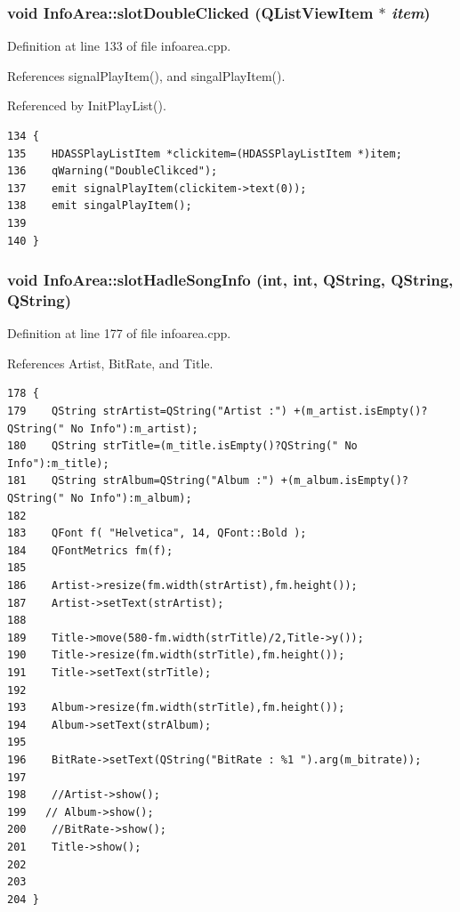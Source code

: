 \subsubsection{\setlength{\rightskip}{0pt plus 5cm}void Info\-Area::slot\-Double\-Clicked (QList\-View\-Item $\ast$ {\em item})\hspace{0.3cm}{\tt  [slot]}}\label{classInfoArea_InfoAreai3}




Definition at line 133 of file infoarea.cpp.

References signal\-Play\-Item(), and singal\-Play\-Item().

Referenced by Init\-Play\-List().



\footnotesize\begin{verbatim}134 {
135    HDASSPlayListItem *clickitem=(HDASSPlayListItem *)item;
136    qWarning("DoubleClikced");
137    emit signalPlayItem(clickitem->text(0));
138    emit singalPlayItem();
139  
140 }
\end{verbatim}\normalsize 
{}
\subsubsection{\setlength{\rightskip}{0pt plus 5cm}void Info\-Area::slot\-Hadle\-Song\-Info (int, int, QString, QString, QString)\hspace{0.3cm}{\tt  [slot]}}\label{classInfoArea_InfoAreai4}




Definition at line 177 of file infoarea.cpp.

References Artist, Bit\-Rate, and Title.



\footnotesize\begin{verbatim}178 {
179    QString strArtist=QString("Artist :") +(m_artist.isEmpty()?QString(" No Info"):m_artist);
180    QString strTitle=(m_title.isEmpty()?QString(" No Info"):m_title);
181    QString strAlbum=QString("Album :") +(m_album.isEmpty()?QString(" No Info"):m_album);
182    
183    QFont f( "Helvetica", 14, QFont::Bold );
184    QFontMetrics fm(f);
185    
186    Artist->resize(fm.width(strArtist),fm.height());
187    Artist->setText(strArtist);
188    
189    Title->move(580-fm.width(strTitle)/2,Title->y());
190    Title->resize(fm.width(strTitle),fm.height());
191    Title->setText(strTitle);
192    
193    Album->resize(fm.width(strTitle),fm.height());
194    Album->setText(strAlbum);
195    
196    BitRate->setText(QString("BitRate : %1 ").arg(m_bitrate));
197     
198    //Artist->show();
199   // Album->show();
200    //BitRate->show();
201    Title->show();
202 
203    
204 }
\end{verbatim}\normalsize 
{}
